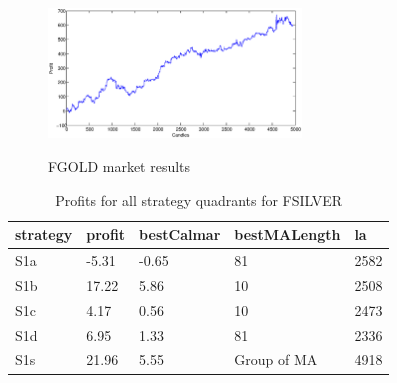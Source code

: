 \documentclass{tewiart}
\begin{document}
\begin{figure}[h]
\begin{minipage}{.49\linewidth}
\label{mansard}
\end{minipage}
\begin{minipage}{\linewidth}
\centering 
\includegraphics[width=0.6\textwidth]{images/S1s_gold.eps}
\label{mansard}
\end{minipage}
\caption{FGOLD market results}
\end{figure}
\FloatBarrier


\newpage
\begin{table}[!t]
\caption{Profits for all strategy quadrants for FSILVER} 
\begin{center}
 \begin{tabular}{|l|l|l|l|l|} 
 \hline \textbf{strategy} & \textbf{profit} & \textbf{bestCalmar} & \textbf{bestMALength} & \textbf{la} \\ \hline  
S1a & -5.31 & -0.65 & 81 & 2582\\ \hline 
S1b & 17.22 & 5.86 & 10 & 2508\\ \hline 
S1c & 4.17 & 0.56 & 10 & 2473\\ \hline 
S1d & 6.95 & 1.33 & 81 & 2336\\ \hline 
S1s & 21.96 & 5.55 & Group of MA & 4918\\ 
\hline \end{tabular} 
 \end{center} 
 \end{table}
\FloatBarrier
\end{document}
